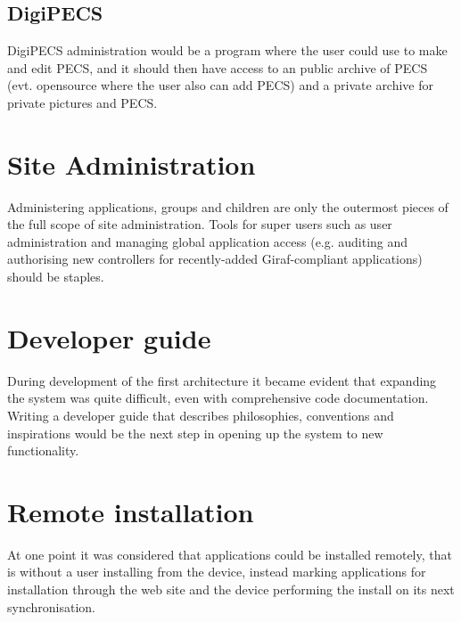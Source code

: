 \subsection{DigiPECS}
DigiPECS administration would be a program where the user could use to make and edit PECS, and it should then have access to an public archive of PECS (evt. opensource where the user also can add PECS) and a private archive for private pictures and PECS. 



\section{Site Administration}
Administering applications, groups and children are only the outermost pieces of the full scope of site administration. Tools for super users such as user administration and managing global application access (e.g. auditing and authorising new controllers for recently-added Giraf-compliant applications) should be staples.

\section{Developer guide}
During development of the first architecture it became evident that expanding the system was quite difficult, even with comprehensive code documentation. Writing a developer guide that describes philosophies, conventions and inspirations would be the next step in opening up the system to new functionality.

\section{Remote installation}
At one point it was considered that applications could be installed remotely, that is without a user installing from the device, instead marking applications for installation through the web site and the device performing the install on its next synchronisation.
